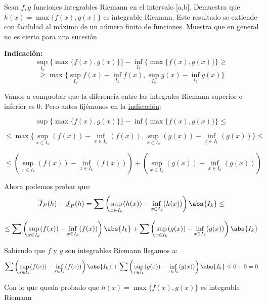 \begin{problem}[2]
Sean $f,g$ funciones integrables Riemann en el intervalo [a,b]. Demuestra que $h(x)=\max\{f(x),g(x)\}$ es integrable Riemann. Este resultado se extiende con facilidad al máximo de un número finito de funciones. Muestra que en general no es cierto para una sucesión

\textbf{Indicación:}
\[\sup_{I_k}\{\max\{f(x),g(x)\}\}-\inf_{I_k}\{\max\{f(x),g(x)\}\} \geq \]
\[\geq \max\{\sup_{I_k}f(x)-\inf_{I_k}f(x), \sup_{I_k}g(x)-\inf_{I_k}g(x)\}\]

\solution
Vamos a comprobar que la diferencia entre las integrales Riemann superior e inferior es 0.
Pero antes fijémonos en la \underline{indicación}:

\[\sup\big\{ \max\{f(x), g(x)\}\big\} - \inf\big\{ \max\{f(x), g(x)\} \big\} \leq \]

\[ \leq \max\big\{ \sup_{x \in I_k} (f(x)) - \inf_{x \in I_k} (f(x)), \sup_{x \in I_k} (g(x)) - \inf_{x \in I_k} (g(x)) \big\} \leq \]

\[ \leq \left(\sup_{x \in I_k} (f(x)) - \inf_{x \in I_k} (f(x))\right) + \left(\sup_{x \in I_k} (g(x)) - \inf_{x \in I_k} (g(x))\right) \]


Ahora podemos probar que:
\[\overline{J}_P(h)-\underline{J}_P(h)
= \sum\left(\sup_{x\in I_k}(h(x))-\inf_{x\in I_k}(h(x))\right)\abs{I_k} \leq\]


\[\leq \sum\left( \sup_{x \in I_k} (f(x)) - \inf_{x \in I_k} (f(x)) \right) \abs{I_k} +
 \sum\left( \sup_{x \in I_k} (g(x)) - \inf_{x \in I_k} (g(x)) \right) \abs{I_k} \]

Sabiendo que $f$ y $g$ son integrables Riemann llegamos a:
\[\sum\left( \sup_{x \in I_k} (f(x)) - \inf_{x \in I_k} (f(x)) \right) \abs{I_k} +
 \sum\left( \sup_{x \in I_k} (g(x)) - \inf_{x \in I_k} (g(x)) \right) \abs{I_k} \leq 0 + 0 = 0\]

 Con lo que queda probado que $h(x) = \max\lbrace f(x), g(x) \rbrace$ es integrable Riemann

\end{problem}

